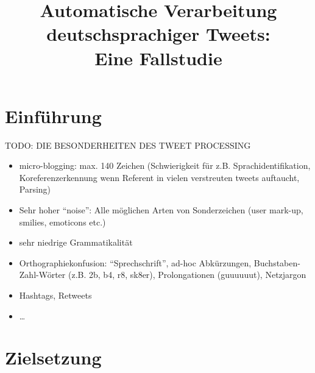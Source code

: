 \documentclass[11pt]{article}
\title{Automatische Verarbeitung deutschsprachiger Tweets:\\ Eine Fallstudie}
\author{}
\date{}
\begin{document}
\maketitle

\thispagestyle{empty}




\section{Einführung}

TODO: DIE BESONDERHEITEN DES TWEET PROCESSING
\begin{itemize}
  \item micro-blogging: max. 140 Zeichen (Schwierigkeit für z.B.
  Sprachidentifikation, Koreferenzerkennung wenn Referent in vielen verstreuten
  tweets auftaucht, Parsing)
  \item Sehr hoher ``noise'': Alle möglichen Arten von Sonderzeichen (user
  mark-up, smilies, emoticons etc.)
  \item sehr niedrige Grammatikalität
  \item Orthographiekonfusion: ``Sprechschrift'', ad-hoc Abkürzungen,
  Buchstaben-Zahl-Wörter (z.B. 2b, b4, r8, sk8er), Prolongationen (guuuuuut),
  Netzjargon
  \item Hashtags, Retweets
  \item \ldots
\end{itemize}


\section{Zielsetzung}
\end{document}

